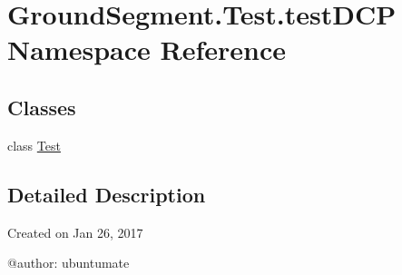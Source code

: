 \hypertarget{namespace_ground_segment_1_1_test_1_1test_d_c_p}{}\section{Ground\+Segment.\+Test.\+test\+D\+C\+P Namespace Reference}
\label{namespace_ground_segment_1_1_test_1_1test_d_c_p}
\subsection*{Classes}
\begin{DoxyCompactItemize}
\item 
class \hyperlink{class_ground_segment_1_1_test_1_1test_d_c_p_1_1_test}{Test}
\end{DoxyCompactItemize}


\subsection{Detailed Description}
\begin{DoxyVerb}Created on Jan 26, 2017

@author: ubuntumate
\end{DoxyVerb}
 